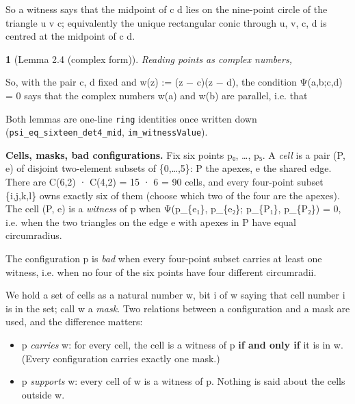 \documentclass[11pt,a4paper]{article}
\theoremstyle{named}
\newtheorem*{namedthm}{}
\newcommand{\dispf}[1]{\par\smallskip{\centering #1\par}\smallskip}
\begin{document}
So a witness says that the midpoint of c d lies on the nine-point circle of the triangle u v c; equivalently the unique rectangular conic through u, v, c, d is centred at the midpoint of c d.

\begin{namedthm}[Lemma 2.4 (complex form)]
Reading points as complex numbers,
\dispf{Im[ (a − c)(a − d) · conj((b − c)(b − d)) ] = − Ψ(a,b;c,d).}
\end{namedthm}

So, with the pair c, d fixed and w(z) := (z − c)(z − d), the condition Ψ(a,b;c,d) = 0 says that the complex numbers w(a) and w(b) are parallel, i.e. that

\dispf{arg[(a − c)(a − d)] ≡ arg[(b − c)(b − d)]  (mod π).}

Both lemmas are one-line \texttt{ring} identities once written down (\texttt{psi\_\allowbreak{}eq\_\allowbreak{}sixteen\_\allowbreak{}det4\_\allowbreak{}mid}, \texttt{im\_\allowbreak{}witnessValue}).

\textbf{Cells, masks, bad configurations.} Fix six points p₀, …, p₅. A \textit{cell} is a pair (P, e) of disjoint two-element subsets of \{0,…,5\}: P the apexes, e the shared edge. There are C(6,2) · C(4,2) = 15 · 6 = 90 cells, and every four-point subset \{i,j,k,l\} owns exactly six of them (choose which two of the four are the apexes). The cell (P, e) is a \textit{witness} of p when Ψ(p\_\{e₁\}, p\_\{e₂\}; p\_\{P₁\}, p\_\{P₂\}) = 0, i.e. when the two triangles on the edge e with apexes in P have equal circumradius.

The configuration p is \textit{bad} when every four-point subset carries at least one witness, i.e. when no four of the six points have four different circumradii.

We hold a set of cells as a natural number w, bit i of w saying that cell number i is in the set; call w a \textit{mask}. Two relations between a configuration and a mask are used, and the difference matters:

\begin{itemize}[leftmargin=1.4em,itemsep=.2em,topsep=.3em]
\item p \textit{carries} w: for every cell, the cell is a witness of p \textbf{if and only if} it is in w. (Every configuration carries exactly one mask.)
\item p \textit{supports} w: every cell of w is a witness of p. Nothing is said about the cells outside w.
\end{itemize}
\end{document}
